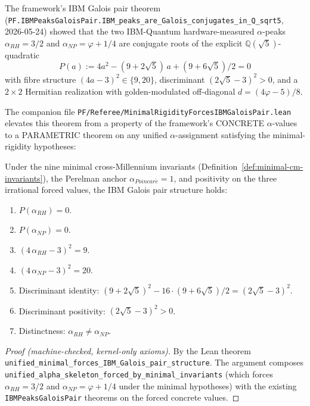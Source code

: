 The framework's IBM Galois pair theorem
(\texttt{PF.\allowbreak{}IBMPeaks\allowbreak{}Galois\allowbreak{}Pair.\allowbreak{}IBM\_\allowbreak{}peaks\_\allowbreak{}are\_\allowbreak{}Galois\_\allowbreak{}conjugates\_\allowbreak{}in\_\allowbreak{}Q\_\allowbreak{}sqrt5},
2026-05-24) showed that the two IBM-Quantum hardware-measured
$\alpha$-peaks $\alpha_{RH} = 3/2$ and $\alpha_{NP} = \varphi + 1/4$
are conjugate roots of the explicit $\mathbb{Q}(\sqrt{5})$-quadratic
\[
P(a) := 4 a^{2} - (9 + 2\sqrt{5})\, a + (9 + 6\sqrt{5})/2 = 0
\]
with fibre structure $(4a - 3)^{2} \in \{9, 20\}$, discriminant
$(2\sqrt{5} - 3)^{2} > 0$, and a $2 \times 2$ Hermitian realization
with golden-modulated off-diagonal $d = (4\varphi - 5)/8$.

The companion file
\texttt{PF/\allowbreak{}Referee/\allowbreak{}Minimal\allowbreak{}Rigidity\allowbreak{}Forces\allowbreak{}IBMGalois\allowbreak{}Pair.\allowbreak{}lean} elevates
this theorem from a property of the framework's CONCRETE
$\alpha$-values to a PARAMETRIC theorem on any unified
$\alpha$-assignment satisfying the minimal-rigidity hypotheses:

\begin{theorem}
\label{thm:ibm-galois-forced}
Under the nine minimal cross-Millennium invariants
(Definition~\ref{def:minimal-cm-invariants}), the Perelman anchor
$\alpha_{Poincar\acute{e}} = 1$, and positivity on the three
irrational forced values, the IBM Galois pair structure holds:
\begin{enumerate}[label=(G\arabic*)]
\item $P(\alpha_{RH}) = 0$.
\item $P(\alpha_{NP}) = 0$.
\item $(4\,\alpha_{RH} - 3)^{2} = 9$.
\item $(4\,\alpha_{NP} - 3)^{2} = 20$.
\item Discriminant identity:
  $(9 + 2\sqrt{5})^{2} - 16 \cdot (9 + 6\sqrt{5})/2 = (2\sqrt{5} - 3)^{2}$.
\item Discriminant positivity:
  $(2\sqrt{5} - 3)^{2} > 0$.
\item Distinctness: $\alpha_{RH} \neq \alpha_{NP}$.
\end{enumerate}
\end{theorem}

\begin{proof}[Proof (machine-checked, kernel-only axioms)]
By the Lean theorem
\texttt{unified\_\allowbreak{}minimal\_\allowbreak{}forces\_\allowbreak{}IBM\_\allowbreak{}Galois\_\allowbreak{}pair\_\allowbreak{}structure}.
The argument composes
\texttt{unified\_\allowbreak{}alpha\_\allowbreak{}skeleton\_\allowbreak{}forced\_\allowbreak{}by\_\allowbreak{}minimal\_\allowbreak{}invariants}
(which forces $\alpha_{RH} = 3/2$ and $\alpha_{NP} = \varphi + 1/4$
under the minimal hypotheses) with the existing
\texttt{IBMPeaksGaloisPair} theorems on the forced concrete values.
\end{proof}

